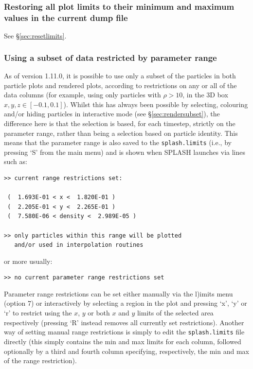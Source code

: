 \documentclass[a4paper,10pt]{article}
\newcommand{\splash}{\textsc{SPLASH }}
\begin{document}
\subsubsection{ Restoring all plot limits to their minimum and maximum values in the current dump file}
See \S\ref{sec:resetlimits}.

\subsubsection{ Using a subset of data restricted by parameter range}
\label{sec:rangerestrict}
 As of version 1.11.0, it is possible to use only a subset of the particles in both particle plots and rendered plots, according to restrictions on any or all of the data columns (for example, using only particles with $\rho > 10$, in the 3D box $x,y,z  \in [-0.1, 0.1]$). Whilst this has always been possible by selecting, colouring and/or hiding particles in interactive mode (see \S\ref{sec:rendersubset}), the difference here is that the selection is based, for each timestep, strictly on the parameter range, rather than being a selection based on particle identity. This means that the parameter range is also saved to the \verb+splash.limits+ (i.e., by pressing `S' from the main menu) and is shown when \splash launches via lines such as:
\begin{verbatim}
>> current range restrictions set: 

 (  1.693E-01 < x <  1.820E-01 )
 (  2.205E-01 < y <  2.265E-01 )
 (  7.580E-06 < density <  2.989E-05 )

>> only particles within this range will be plotted 
   and/or used in interpolation routines
\end{verbatim}
or more usually:
\begin{verbatim}
>> no current parameter range restrictions set 
\end{verbatim}

 Parameter range restrictions can be set either manually via the l)imits menu (option 7) or interactively by selecting a region in the plot and pressing `x', `y' or `r' to restrict using the $x$, $y$ or both $x$ and $y$ limits of the selected area respectively (pressing `R' instead removes all currently set restrictions). Another way of setting manual range restrictions is simply to edit the \verb+splash.limits+ file directly (this simply contains the min and max limits for each column, followed optionally by a third and fourth column specifying, respectively, the min and max of the range restriction).
\end{document}
